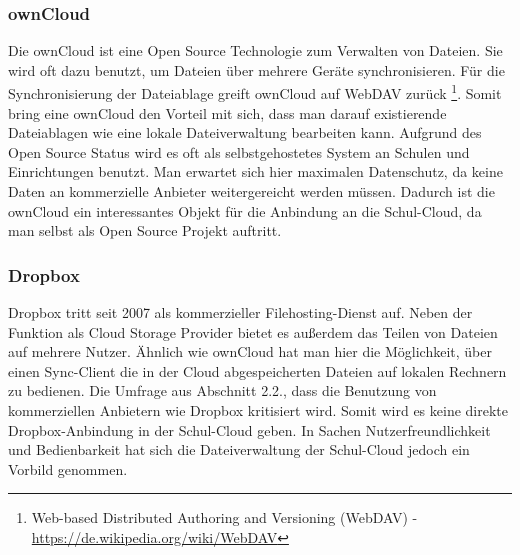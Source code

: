 \subsubsection{ownCloud}

Die ownCloud ist eine Open Source Technologie zum Verwalten von Dateien. Sie wird oft dazu benutzt, um Dateien über mehrere Geräte synchronisieren. Für die Synchronisierung der Dateiablage greift ownCloud auf WebDAV zurück \footnote{Web-based Distributed Authoring and Versioning (WebDAV) - \url{https://de.wikipedia.org/wiki/WebDAV}}. Somit bring eine ownCloud den Vorteil mit sich, dass man darauf existierende Dateiablagen wie eine lokale Dateiverwaltung bearbeiten kann. Aufgrund des Open Source Status wird es oft als selbstgehostetes System an Schulen und Einrichtungen benutzt. Man erwartet sich hier maximalen Datenschutz, da keine Daten an kommerzielle Anbieter weitergereicht werden müssen. Dadurch ist die ownCloud ein interessantes Objekt für die Anbindung an die Schul-Cloud, da man selbst als Open Source Projekt auftritt.

\subsubsection{Dropbox}

Dropbox tritt seit 2007 als kommerzieller Filehosting-Dienst auf. Neben der Funktion als Cloud Storage Provider bietet es außerdem das Teilen von Dateien auf mehrere Nutzer. Ähnlich wie ownCloud hat man hier die Möglichkeit, über einen Sync-Client die in der Cloud abgespeicherten Dateien auf lokalen Rechnern zu bedienen. Die Umfrage aus Abschnitt 2.2., dass die Benutzung von kommerziellen Anbietern wie Dropbox kritisiert wird. Somit wird es keine direkte Dropbox-Anbindung in der Schul-Cloud geben. In Sachen Nutzerfreundlichkeit und Bedienbarkeit hat sich die Dateiverwaltung der Schul-Cloud jedoch ein Vorbild genommen. 

\clearpage
